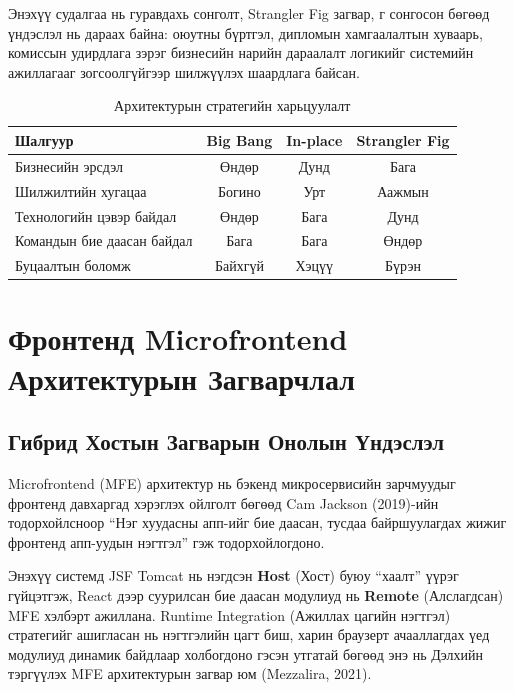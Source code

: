 Энэхүү судалгаа нь гуравдахь сонголт, Strangler Fig загвар, г
сонгосон бөгөөд үндэслэл нь дараах байна: оюутны бүртгэл, дипломын
хамгаалалтын хуваарь, комиссын удирдлага зэрэг бизнесийн нарийн дараалалт
логикийг системийн ажиллагааг зогсоолгүйгээр шилжүүлэх шаардлага байсан.

\begin{table}[H]
    \centering
    \caption{Архитектурын стратегийн харьцуулалт}
    \label{tab:arch_strategy}
    \renewcommand{\arraystretch}{0.7}
    \begin{tabular}{lccc}
        \toprule
        \textbf{Шалгуур} & \textbf{Big Bang} & \textbf{In-place} & \textbf{Strangler Fig} \\
        \midrule
        Бизнесийн эрсдэл         & Өндөр  & Дунд   & Бага   \\
        Шилжилтийн хугацаа       & Богино & Урт    & Аажмын \\
        Технологийн цэвэр байдал & Өндөр  & Бага   & Дунд   \\
        Командын бие даасан байдал & Бага  & Бага   & Өндөр  \\
        Буцаалтын боломж         & Байхгүй & Хэцүү & Бүрэн  \\
        \bottomrule
    \end{tabular}
\end{table}

\section{Фронтенд Microfrontend Архитектурын Загварчлал}

\subsection{Гибрид Хостын Загварын Онолын Үндэслэл}

Microfrontend (MFE) архитектур нь бэкенд микросервисийн зарчмуудыг
фронтенд давхаргад хэрэглэх ойлголт бөгөөд Cam Jackson (2019)-ийн
тодорхойлсноор ``Нэг хуудасны апп-ийг бие даасан, тусдаа байршуулагдах
жижиг фронтенд апп-уудын нэгтгэл'' гэж тодорхойлогдоно.

Энэхүү системд JSF Tomcat нь нэгдсэн \textbf{Host} (Хост) буюу ``хаалт''
үүрэг гүйцэтгэж, React дээр суурилсан бие даасан модулиуд нь
\textbf{Remote} (Алслагдсан) MFE хэлбэрт ажиллана. Runtime Integration
(Ажиллах цагийн нэгтгэл) стратегийг ашигласан нь нэгтгэлийн цагт биш,
харин браузерт ачааллагдах үед модулиуд динамик байдлаар холбогдоно
гэсэн утгатай бөгөөд энэ нь Дэлхийн тэргүүлэх MFE архитектурын загвар
юм (Mezzalira, 2021).

